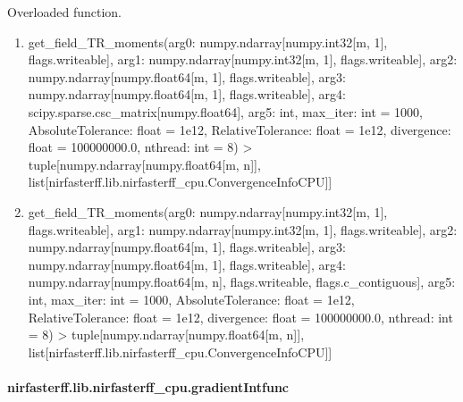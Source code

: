 \documentclass[letterpaper,10pt,english]{sphinxmanual}
\begin{document}
\begin{fulllineitems}
\label{\detokenize{_autosummary/nirfasterff.lib.nirfasterff_cpu.get_field_TR_moments:nirfasterff.lib.nirfasterff_cpu.get_field_TR_moments}}
\pysigstartsignatures
\pysiglinewithargsret
{}
{\sphinxparamcomma {}}
{}
\pysigstopsignatures
\sphinxAtStartPar
Overloaded function.
\begin{enumerate}
%
\item {} 
\sphinxAtStartPar
get\_field\_TR\_moments(arg0: numpy.ndarray{[}numpy.int32{[}m, 1{]}, flags.writeable{]}, arg1: numpy.ndarray{[}numpy.int32{[}m, 1{]}, flags.writeable{]}, arg2: numpy.ndarray{[}numpy.float64{[}m, 1{]}, flags.writeable{]}, arg3: numpy.ndarray{[}numpy.float64{[}m, 1{]}, flags.writeable{]}, arg4: scipy.sparse.csc\_matrix{[}numpy.float64{]}, arg5: int, max\_iter: int = 1000, AbsoluteTolerance: float = 1e\sphinxhyphen{}12, RelativeTolerance: float = 1e\sphinxhyphen{}12, divergence: float = 100000000.0, nthread: int = 8) \sphinxhyphen{}\textgreater{} tuple{[}numpy.ndarray{[}numpy.float64{[}m, n{]}{]}, list{[}nirfasterff.lib.nirfasterff\_cpu.ConvergenceInfoCPU{]}{]}

\item {} 
\sphinxAtStartPar
get\_field\_TR\_moments(arg0: numpy.ndarray{[}numpy.int32{[}m, 1{]}, flags.writeable{]}, arg1: numpy.ndarray{[}numpy.int32{[}m, 1{]}, flags.writeable{]}, arg2: numpy.ndarray{[}numpy.float64{[}m, 1{]}, flags.writeable{]}, arg3: numpy.ndarray{[}numpy.float64{[}m, 1{]}, flags.writeable{]}, arg4: numpy.ndarray{[}numpy.float64{[}m, n{]}, flags.writeable, flags.c\_contiguous{]}, arg5: int, max\_iter: int = 1000, AbsoluteTolerance: float = 1e\sphinxhyphen{}12, RelativeTolerance: float = 1e\sphinxhyphen{}12, divergence: float = 100000000.0, nthread: int = 8) \sphinxhyphen{}\textgreater{} tuple{[}numpy.ndarray{[}numpy.float64{[}m, n{]}{]}, list{[}nirfasterff.lib.nirfasterff\_cpu.ConvergenceInfoCPU{]}{]}

\end{enumerate}

\end{fulllineitems}


\sphinxstepscope


\paragraph{nirfasterff.lib.nirfasterff\_cpu.gradientIntfunc}
\label{\detokenize{_autosummary/nirfasterff.lib.nirfasterff_cpu.gradientIntfunc:nirfasterff-lib-nirfasterff-cpu-gradientintfunc}}\label{\detokenize{_autosummary/nirfasterff.lib.nirfasterff_cpu.gradientIntfunc::doc}}
\end{document}
